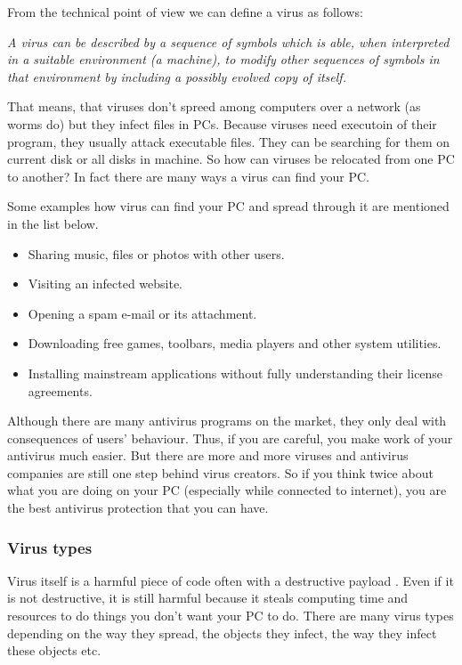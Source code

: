 \documentclass[review]{elsarticle}
\begin{document}
From the technical point of view we can define a virus as follows:
\vspace{5pt}

\textit{A virus can be described by a sequence of symbols which is able, when interpreted in a suitable environment (a machine), to modify other sequences of symbols in that environment by including a possibly evolved copy of itself.}
\vspace{5pt}

That means, that viruses don't spreed among computers over a network (as worms do) but they infect files in PCs. Because viruses need executoin of their program, they usually attack executable files. They can be searching for them on current disk or all disks in machine. So how can viruses be relocated from one PC to another? In fact there are many ways a virus can find your PC. \cite{webroot}

Some examples how virus can find your PC and spread through it are mentioned in the list below.

\begin{itemize}
	\item Sharing music, files or photos with other users.
	\item Visiting an infected website.
	\item Opening a spam e-mail or its attachment.
	\item Downloading free games, toolbars, media players and other system utilities.
	\item Installing mainstream applications without fully understanding their license agreements.
\end{itemize}

Although there are many antivirus programs on the market, they only deal with consequences of users' behaviour. Thus, if you are careful, you make work of your antivirus much easier. But there are more and more viruses and antivirus companies are still one step behind virus creators. So if you think twice about what you are doing on your PC (especially while connected to internet), you are the best antivirus protection that you can have. 

\subsubsection{Virus types}
Virus itself is a harmful piece of code often with a destructive payload . Even if it is not destructive, it is still harmful because it steals computing time and resources to do things you don't want your PC to do.
There are many virus types depending on the way they spread, the objects they infect, the way they infect these objects etc. \cite{panda}\\
\end{document}
